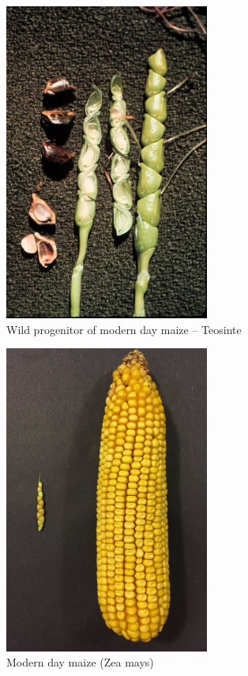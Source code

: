 \documentclass[11pt,ignorenonframetext,aspectratio=169]{beamer}
\begin{document}
\begin{frame}{}
\protect\hypertarget{section-9}{}
\begin{figure}
\includegraphics[width=0.6\textwidth, keepaspectratio,height=0.45\textheight]{./images/Teosinte} \caption{Wild progenitor of modern day maize -- Teosinte}\label{fig:maize-ancestor-teosinte}
\end{figure}

\begin{figure}
\includegraphics[width=0.6\textwidth, keepaspectratio,height=0.45\textheight]{./images/Teosinte_maize} \caption{Modern day maize (Zea mays)}\label{fig:maize-modern}
\end{figure}
\end{frame}
\end{document}
